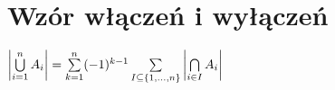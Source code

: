 \section{Wzór włączeń i wyłączeń}

$\left| \bigcup\limits_{i=1}^{n} A_i \right| = 
\sum\limits_{k=1}^{n} (-1)^{k-1}
\sum\limits_{I \subseteq \{ 1,\ldots,n \}} \left| \bigcap\limits_{i \in I} A_i \right|$